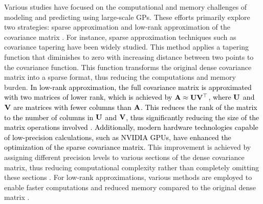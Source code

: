 \documentclass[12pt]{article}
\begin{document}
Various studies have focused on the computational and memory challenges of modeling and predicting using large-scale GPs. These efforts primarily explore two strategies: sparse approximation and low-rank approximation of the covariance matrix \citep{furrer2006covariance,kaufman2008covariance,bevilacqua2016covariance}. For instance, sparse approximation techniques such as covariance tapering have been widely studied. This method applies a tapering function that diminishes to zero with increasing distance between two points to the covariance function. This function transforms the original dense covariance matrix into a sparse format, thus reducing the computations and memory burden.
\textcolor{black}{
In low-rank approximation, the full covariance matrix is approximated with two matrices of lower rank, which is achieved by $\bf A \approx UV^\top$, where $\bf U$ and $\bf V$ are matrices with fewer columns than $\bf A$. This reduces the rank of the matrix to the number of columns in $\bf U$ and 
$\bf V$, thus significantly reducing the size of the matrix operations involved \citep{huang2018hierarchical, mondal2023tile}.
Additionally, modern hardware technologies capable of low-precision calculations, such as NVIDIA GPUs, have enhanced the optimization of the sparse covariance matrix.} This improvement is achieved by assigning different precision levels to various sections of the dense covariance matrix, thus reducing computational complexity rather than completely omitting these sections \citep{abdulah2019geostatistical,abdulah2021accelerating,cao2022reshaping}. For low-rank approximations, various methods are employed to enable faster computations and reduced memory compared to the original dense matrix \citep{katzfuss2011spatio,huang2018hierarchical,abdulah2018parallel, mondal2022parallel}.
\end{document}
